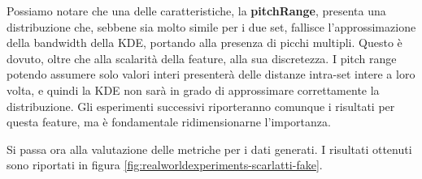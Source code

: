 Possiamo notare che una delle caratteristiche, la \textbf{pitchRange}, presenta una distribuzione che, sebbene sia molto simile per i due set, fallisce l'approssimazione della bandwidth della KDE, portando alla presenza di picchi multipli. Questo è dovuto, oltre che alla scalarità della feature, alla sua discretezza.
I pitch range potendo assumere solo valori interi presenterà delle distanze intra-set intere a loro volta, e quindi la KDE non sarà in grado di approssimare correttamente la distribuzione. Gli esperimenti successivi riporteranno comunque i risultati per questa feature, ma è fondamentale ridimensionarne l'importanza.

Si passa ora alla valutazione delle metriche per i dati generati. I risultati ottenuti sono riportati in figura \ref{fig:realworldexperiments-scarlatti-fake}.

